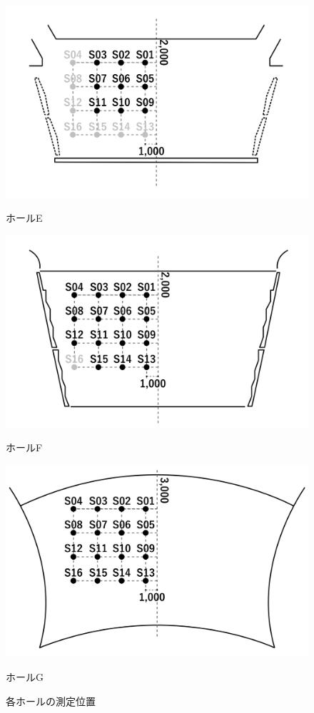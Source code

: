 \documentclass[11pt,a4j]{jreport}
\begin{document}
\begin{figure}[H]
  \begin{minipage}[b]{.5\textwidth}
    \centering
    \includegraphics[width=.9\linewidth]{images/measuredHalls/flatud_hall_e.png}
    \caption*{ホールE}
  \end{minipage}%
  \begin{minipage}[b]{.5\textwidth}
    \centering
    \includegraphics[width=.9\linewidth]{images/measuredHalls/flatud_hall_f.png}
    \caption*{ホールF}
  \end{minipage}

  \begin{minipage}[b]{1\textwidth}
    \centering
    \includegraphics[width=.45\linewidth]{images/measuredHalls/flatud_hall_g.png}
    \caption*{ホールG}
  \end{minipage}

  \caption{各ホールの測定位置}
  \label{fig:各ホールの測定位置}
\end{figure}
\end{document}
